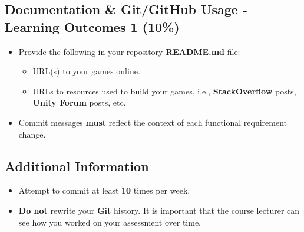 \documentclass{article}
\begin{document}
\subsection*{Documentation \& Git/GitHub Usage - Learning Outcomes 1 (10\%)}
\begin{itemize}
	\item Provide the following in your repository \textbf{README.md} file:
	      \begin{itemize}
		      \item URL(s) to your games online.
		      \item URLs to resources used to build your games, i.e., \textbf{StackOverflow} posts, \textbf{Unity Forum} posts, etc.
	      \end{itemize}
	\item Commit messages \textbf{must} reflect the context of each functional requirement change.
\end{itemize}

\subsection*{Additional Information}
\begin{itemize}
	\item Attempt to commit at least \textbf{10} times per week.
	\item \textbf{Do not} rewrite your \textbf{Git} history. It is important that the course lecturer can see how you worked on your assessment over time.
\end{itemize}
\end{document}

